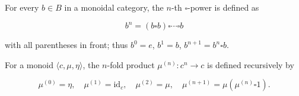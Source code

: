 For every $b \in B$ in a monoidal category, the $n$-th $\square$-power is defined as

$$b^n = (b \square b) \square \cdots \square b$$

with all parentheses in front; thus $b^0 = e$, $b^1 = b$, $b^{n+1} = b^n \square b$.

For a monoid $\langle c, \mu, \eta \rangle$, the $n$-fold product $\mu^{(n)} : c^n \rightarrow c$ is defined recursively by

$$\mu^{(0)} = \eta, \quad \mu^{(1)} = \mathrm{id}_c, \quad \mu^{(2)} = \mu, \quad \mu^{(n+1)} = \mu(\mu^{(n)} \square 1).$$
